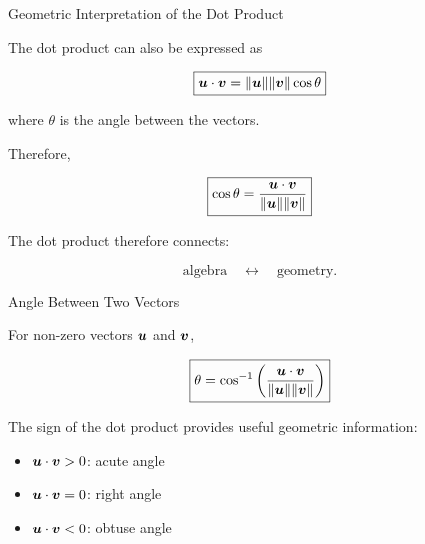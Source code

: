 
\begin{frame}{Geometric Interpretation of the Dot Product}

The dot product can also be expressed as

\[
\boxed{
\bm{u}\cdot\bm{v}
=
\|\bm{u}\|
\|\bm{v}\|
\cos\theta
}
\]

where $\theta$ is the angle between the vectors.

\vspace{0.4cm}

Therefore,

\[
\boxed{
\cos\theta
=
\frac{
\bm{u}\cdot\bm{v}
}{
\|\bm{u}\|\|\bm{v}\|
}
}
\]

\vspace{0.3cm}

The dot product therefore connects:

\[
\text{algebra}
\quad\longleftrightarrow\quad
\text{geometry}.
\]

\end{frame}



\begin{frame}{Angle Between Two Vectors}

For non-zero vectors $\bm{u}$ and $\bm{v}$,

\[
\boxed{
\theta
=
\cos^{-1}
\left(
\frac{
\bm{u}\cdot\bm{v}
}{
\|\bm{u}\|\|\bm{v}\|
}
\right)
}
\]

\vspace{0.5cm}

The sign of the dot product provides useful geometric information:

\begin{itemize}
    \item $\bm{u}\cdot\bm{v}>0$: acute angle
    \item $\bm{u}\cdot\bm{v}=0$: right angle
    \item $\bm{u}\cdot\bm{v}<0$: obtuse angle
\end{itemize}

\end{frame}



